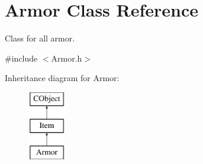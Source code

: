 \hypertarget{class_armor}{}\section{Armor Class Reference}
\label{class_armor}


Class for all armor.  




{\ttfamily \#include $<$Armor.\+h$>$}

Inheritance diagram for Armor\+:\begin{figure}[H]
\begin{center}
\leavevmode
\includegraphics[height=3.000000cm]{class_armor}
\end{center}
\end{figure}
